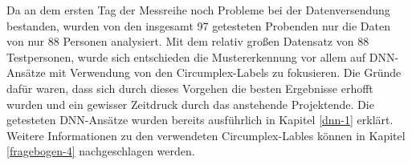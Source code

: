 

Da an dem ersten Tag der Messreihe noch Probleme bei der Datenversendung bestanden, wurden von den insgesamt 97 getesteten Probenden nur die Daten von nur 88 Personen analysiert.
Mit dem relativ großen Datensatz von 88 Testpersonen, wurde sich entschieden die Mustererkennung vor allem auf DNN-Ansätze mit Verwendung von den Circumplex-Labels zu fokusieren.
Die Gründe dafür waren, dass sich durch dieses Vorgehen die besten Ergebnisse erhofft wurden und ein gewisser Zeitdruck durch das anstehende Projektende.
Die getesteten DNN-Ansätze wurden bereits ausführlich in Kapitel \ref{dnn-1} erklärt.
Weitere Informationen zu den verwendeten Circumplex-Lables können in Kapitel \ref{fragebogen-4} nachgeschlagen werden.